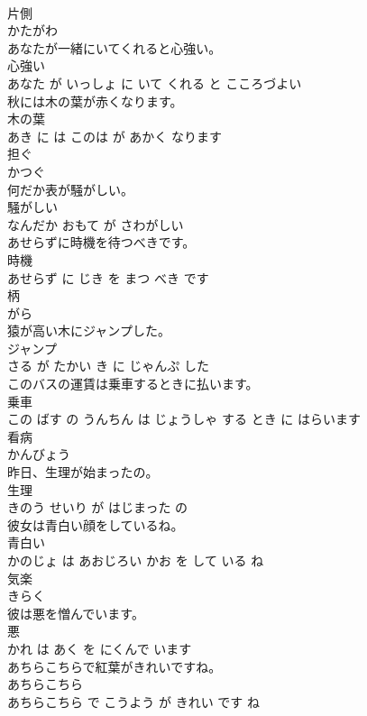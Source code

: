 \documentclass[8pt]{extreport}
\begin{document}
\begin{CJK}{UTF8}{min}
\\	片側	
\\	かたがわ			
\\	あなたが一緒にいてくれると心強い。	
\\	心強い 
\\	あなた が いっしょ に いて くれる と こころづよい			
\\	秋には木の葉が赤くなります。	
\\	木の葉 
\\	あき に は このは が あかく なります			
\\	担ぐ	
\\	かつぐ			
\\	何だか表が騒がしい。	
\\	騒がしい 
\\	なんだか おもて が さわがしい			
\\	あせらずに時機を待つべきです。	
\\	時機 
\\	あせらず に じき を まつ べき です			
\\	柄	
\\	がら			
\\	猿が高い木にジャンプした。	
\\	ジャンプ 
\\	さる が たかい き に じゃんぷ した			
\\	このバスの運賃は乗車するときに払います。	
\\	乗車 
\\	この ばす の うんちん は じょうしゃ する とき に はらいます			
\\	看病	
\\	かんびょう			
\\	昨日、生理が始まったの。	
\\	生理 
\\	きのう せいり が はじまった の			
\\	彼女は青白い顔をしているね。	
\\	青白い 
\\	かのじょ は あおじろい かお を して いる ね			
\\	気楽	
\\	きらく			
\\	彼は悪を憎んでいます。	
\\	悪 
\\	かれ は あく を にくんで います			
\\	あちらこちらで紅葉がきれいですね。	
\\	あちらこちら 
\\	あちらこちら で こうよう が きれい です ね			

\end{CJK}
\end{document}
